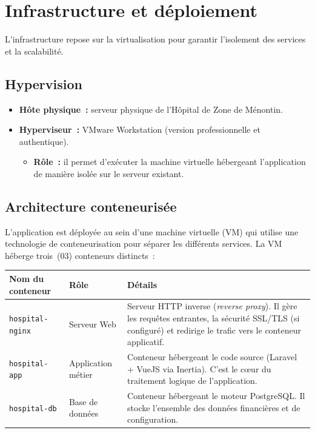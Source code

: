 \documentclass[11pt,a4paper]{article}
\begin{document}
\section{Infrastructure et déploiement}

L'infrastructure repose sur la virtualisation pour garantir l'isolement des services et la scalabilité.

\subsection{Hypervision}
\begin{itemize}
  \item \textbf{Hôte physique~:} serveur physique de l'Hôpital de Zone de Ménontin.
  \item \textbf{Hyperviseur~:} VMware Workstation (version professionnelle et authentique).
  \begin{itemize}
    \item[\textcolor{primary}{\textbf{$\rightarrow$}}] \textbf{Rôle~:} il permet d'exécuter la machine virtuelle hébergeant l'application de manière isolée sur le serveur existant.
  \end{itemize}
\end{itemize}

\subsection{Architecture conteneurisée}
L'application est déployée au sein d'une machine virtuelle (VM) qui utilise une technologie de conteneurisation pour séparer les différents services. La VM héberge trois~(03) conteneurs distincts~:

\renewcommand{\arraystretch}{1.3}
\begin{tabularx}{\textwidth}{@{} l l X @{}}
\toprule
\textbf{Nom du conteneur} & \textbf{Rôle} & \textbf{Détails} \\
\midrule
\texttt{hospital-nginx} & Serveur Web & Serveur HTTP inverse (\emph{reverse proxy}). Il gère les requêtes entrantes, la sécurité SSL/TLS (si configuré) et redirige le trafic vers le conteneur applicatif. \\
\addlinespace
\texttt{hospital-app} & Application métier & Conteneur hébergeant le code source (Laravel + VueJS via Inertia). C'est le cœur du traitement logique de l'application. \\
\addlinespace
\texttt{hospital-db} & Base de données & Conteneur hébergeant le moteur PostgreSQL. Il stocke l'ensemble des données financières et de configuration. \\
\bottomrule
\end{tabularx}
\renewcommand{\arraystretch}{1}
\end{document}
